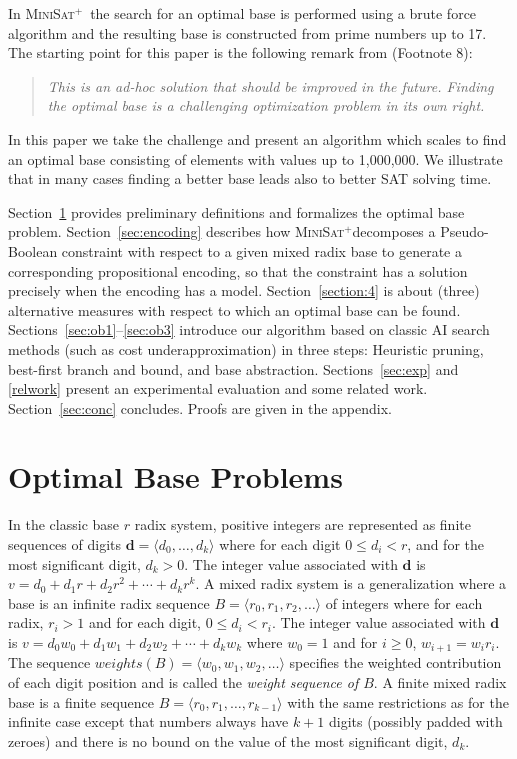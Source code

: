 \documentclass[envcountsame]{llncs}
\newcommand{\bfd}{\mathbf{d}}
\newcommand\tuple[1]{\langle #1 \rangle}
\newcommand\minisatp{\textsc{MiniSat$^+$}}
\begin{document}
In \minisatp\ the search for an optimal base is performed using a
brute force algorithm and the resulting base is constructed from prime
numbers up to 17. The starting point for this paper is the following
remark	 from \cite{EenS06} (Footnote 8):
\vspace{-1mm}
\begin{quotation}\noindent
  \emph{This is an ad-hoc solution that should be improved in the
  future. Finding the optimal base is a challenging optimization
  problem in its own right.}
\end{quotation}
In this paper we take the challenge and present an algorithm which
scales to find an optimal base consisting of elements 
with values up to 1,000,000. We illustrate that in many
cases finding a better base leads also to better SAT solving time.

\pagebreak

Section~\ref{section:obp} provides preliminary definitions and
formalizes the optimal base problem.
Section~\ref{sec:encoding} describes how \minisatp decomposes a
Pseudo-Boolean constraint with respect to a given mixed radix base to
generate a corresponding propositional encoding, so that the constraint has
a solution precisely when the encoding has a model.
Section~\ref{section:4} is about (three) alternative measures with
respect to which an optimal base can be found.
Sections~\ref{sec:ob1}--\ref{sec:ob3} introduce our algorithm
based on classic AI search methods (such as cost underapproximation)
in
three steps: Heuristic pruning, best-first branch and bound, and base
abstraction.  
Sections~\ref{sec:exp} and \ref{relwork} present an experimental
evaluation and some related work.  
Section~\ref{sec:conc} concludes. 
Proofs are given in the appendix.




\section{Optimal Base Problems}
\label{section:obp}

In the classic base $r$ radix system, positive integers are
represented as finite sequences of digits
$\bfd=\tuple{d_0,\ldots,d_k}$ where for each digit $0\leq d_i<r$, and
for the most significant digit, $d_k>0$.  The integer value associated
with $\bfd$ is $v=d_0 + d_1r + d_2r^2+\cdots+d_kr^k$.
A mixed radix system is a generalization where a base is an infinite
radix sequence $B=\tuple{r_0,r_1,r_2,\ldots}$ of integers where for
each radix, $r_i>1$ and for each digit, $0\leq d_i < r_i$.
The integer value associated with $\bfd$ is 
$v = d_0w_0+ d_1w_1 + d_2w_2+\cdots+d_kw_k$
where $w_0 = 1$ and for $i\ge 0$, $w_{i+1} = w_ir_i$.
The sequence $weights(B)=\tuple{w_0,w_1,w_2,\ldots}$ specifies the
weighted contribution of each  digit position and is called the
\emph{weight sequence of $B$}.  
A finite mixed radix base is a finite sequence
$B=\tuple{r_0,r_1,\ldots,r_{k-1}}$ with the same restrictions as for
the infinite case except that numbers always have $k+1$ digits
(possibly padded with zeroes) and there is no bound on the value of
the most significant digit, $d_k$.
\end{document}
